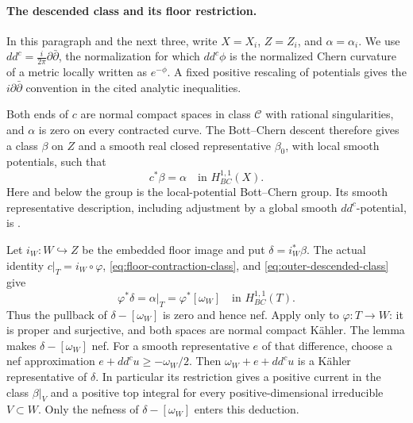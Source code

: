 \paragraph{The descended class and its floor restriction.}
In this paragraph and the next three, write \(X=X_i\), \(Z=Z_i\), and
\(\alpha=\alpha_i\).  We use
\(dd^c=\frac{i}{2\pi}\partial\bar\partial\), the normalization for
which \(dd^c\phi\) is the normalized Chern curvature of a metric
locally written as \(e^{-\phi}\).  A fixed positive rescaling of potentials gives the
\(i\partial\bar\partial\) convention in the cited analytic inequalities.

Both ends of \(c\) are normal compact spaces in class \(\mathcal C\)
with rational singularities, and \(\alpha\) is zero on every contracted
curve.  The Bott--Chern descent
\cite[Lemma~2.11]{DasHacon2024} therefore gives a class \(\beta\) on
\(Z\) and a smooth real closed representative \(\beta_0\), with local
smooth potentials, such that
\begin{equation}\label{eq:outer-descended-class}
 c^*\beta=\alpha\quad\text{in }H^{1,1}_{BC}(X).
\end{equation}
Here and below the group is the local-potential Bott--Chern group.
Its smooth representative description, including adjustment by a global
smooth \(dd^c\)-potential, is
\cite[Definition~3.1 and Remark~3.2]{HoeringPeternell2016}.

Let \(i_W:W\hookrightarrow Z\) be the embedded floor image and put
\(\delta=i_W^*\beta\).  The actual identity
\(c|_T=i_W\circ\varphi\), \eqref{eq:floor-contraction-class}, and
\eqref{eq:outer-descended-class} give
\begin{equation}\label{eq:outer-floor-image-class}
 \varphi^*\delta=\alpha|_T=\varphi^*[\omega_W]
 \quad\text{in }H^{1,1}_{BC}(T).
\end{equation}
Thus the pullback of \(\delta-[\omega_W]\) is zero and hence nef.
Apply \cite[Lemma~2.38]{DasHaconPaun2024} only to
\(\varphi:T\to W\): it is proper and surjective, and both spaces are
normal compact K\"ahler.  The lemma makes \(\delta-[\omega_W]\) nef.
For a smooth representative \(e\) of that difference, choose a nef
approximation \(e+dd^c u\geq-\omega_W/2\).  Then
\(\omega_W+e+dd^c u\) is a K\"ahler representative of \(\delta\).
In particular its restriction gives a positive current in the class
\(\beta|_V\) and a positive top integral for every positive-dimensional
irreducible \(V\subset W\).  Only the nefness of
\(\delta-[\omega_W]\) enters this deduction.

